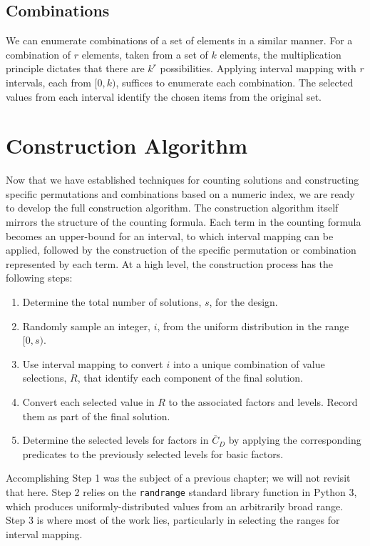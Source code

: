 \subsection{Combinations}

We can enumerate combinations of a set of elements in a similar manner. For a combination of $r$ elements, taken from a set of $k$ elements, the multiplication principle dictates that there are $k^r$ possibilities. Applying interval mapping with $r$ intervals, each from $[0, k)$, suffices to enumerate each combination. The selected values from each interval identify the chosen items from the original set.

\section{Construction Algorithm}

Now that we have established techniques for counting solutions and constructing specific permutations and combinations based on a numeric index, we are ready to develop the full construction algorithm. The construction algorithm itself mirrors the structure of the counting formula. Each term in the counting formula becomes an upper-bound for an interval, to which interval mapping can be applied, followed by the construction of the specific permutation or combination represented by each term. At a high level, the construction process has the following steps:

\begin{enumerate}
\item Determine the total number of solutions, $s$, for the design.
\item Randomly sample an integer, $i$, from the uniform distribution in the range $[0, s)$.
\item Use interval mapping to convert $i$ into a unique combination of value selections, $R$, that identify each component of the final solution.
\item Convert each selected value in $R$ to the associated factors and levels. Record them as part of the final solution.
\item Determine the selected levels for factors in $\overline{C}_D$ by applying the corresponding predicates to the previously selected levels for basic factors.
\end{enumerate}

Accomplishing Step 1 was the subject of a previous chapter; we will not revisit that here. Step 2 relies on the \texttt{randrange} standard library function in Python 3, which produces uniformly-distributed values from an arbitrarily broad range. Step 3 is where most of the work lies, particularly in selecting the ranges for interval mapping.

